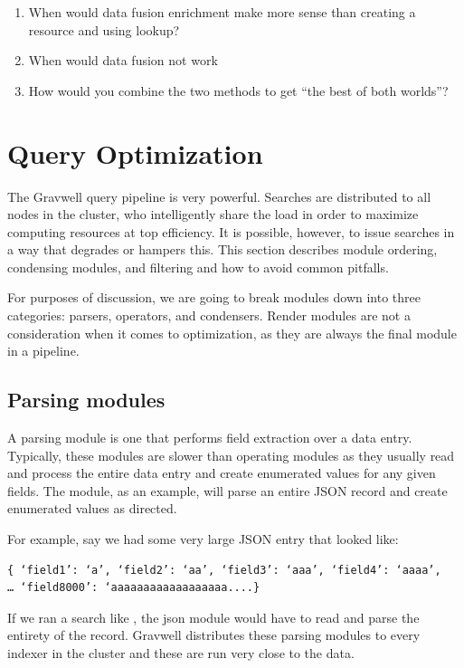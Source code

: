 \begin{enumerate}
\item
  {When would data fusion enrichment make more sense than creating a
  resource and using lookup?}
\item
  {When would data fusion not work}
\item
  {How would you combine the two methods to get ``the best of both
  worlds''?}
\end{enumerate}


\section{Query Optimization}
\label{sec:query-optimization}

The Gravwell query pipeline is very powerful. Searches are distributed
to all nodes in the cluster, who intelligently share the load in order to
maximize computing resources at top efficiency. It is possible, however,
to issue searches in a way that degrades or hampers this.
This section describes module ordering, condensing modules, and filtering
and how to avoid common pitfalls.

For purposes of discussion, we are going to break modules
down into three categories: parsers, operators, and condensers. Render
modules are not a consideration when it comes to optimization, as they
are always the final module in a pipeline.

\subsection{Parsing modules}

A parsing module is one that performs field extraction over a data
entry. Typically, these modules are slower than operating modules as
they usually read and process the entire data entry and create
enumerated values for any given fields. The  module, as an
example, will parse an entire JSON record and create enumerated values
as directed.

For example, say we had some very large JSON entry that looked like:

\begin{Verbatim}[breaklines=true]
{ ‘field1’: ‘a’, ‘field2’: ‘aa’, ‘field3’: ‘aaa’, ‘field4’: ‘aaaa’, 
… ‘field8000’: ‘aaaaaaaaaaaaaaaaaa....}
\end{Verbatim}

If we ran a search like , the json
module would have to read and parse the entirety of the record. Gravwell
distributes these parsing modules to every indexer in the cluster and
these are run very close to the data.

